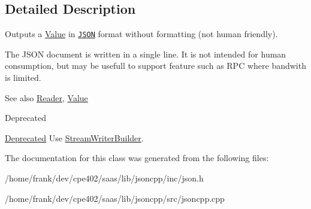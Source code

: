 \subsection{Detailed Description}
Outputs a \hyperlink{class_json_1_1_value}{Value} in \href{http://www.json.org}{\tt J\+S\+O\+N} format without formatting (not human friendly). 

The J\+S\+O\+N document is written in a single line. It is not intended for \textquotesingle{}human\textquotesingle{} consumption, but may be usefull to support feature such as R\+P\+C where bandwith is limited. \begin{DoxySeeAlso}{See also}
\hyperlink{class_json_1_1_reader}{Reader}, \hyperlink{class_json_1_1_value}{Value} 
\end{DoxySeeAlso}
\begin{DoxyRefDesc}{Deprecated}
\item[\hyperlink{deprecated__deprecated000008}{Deprecated}]Use \hyperlink{class_json_1_1_stream_writer_builder}{Stream\+Writer\+Builder}. \end{DoxyRefDesc}


The documentation for this class was generated from the following files\+:\begin{DoxyCompactItemize}
\item 
/home/frank/dev/cpe402/saas/lib/jsoncpp/inc/json.\+h\item 
/home/frank/dev/cpe402/saas/lib/jsoncpp/src/jsoncpp.\+cpp\end{DoxyCompactItemize}
